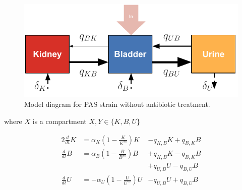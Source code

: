 \documentclass{article}
\begin{document}
\begin{figure}
	\centering
	\includegraphics[width=0.8\linewidth]{images/draw_Anoruti_Compartments_oneline_v001.pdf}
	\caption{Model diagram for PAS strain without antibiotic treatment. }
	\label{fig:ModelOnelineNOATB}
\end{figure}






where $X$ is a compartment $X, Y \in \{K, B , U\}$



\begin{alignat}{2}
\frac{d}{dt} K &=  \alpha_K \left( 1 - \frac{K}{K^{ss}}\right) K &- q_{K,B} K + q_{B,K} B \nonumber \\
\frac{d}{dt} B &=  \alpha_B \left( 1 - \frac{B}{B^{ss}}\right) B &+ q_{K,B} K - q_{B,K} B \nonumber \\
&              &+ q_{U,B} U - q_{B,U} B \nonumber \\
\frac{d}{dt} U &= -\alpha_U \left( 1 - \frac{U}{U^{ss}}\right) U &- q_{U,B} U + q_{B,U} B \label{eq:ODElogistic}
\end{alignat}
\end{document}
